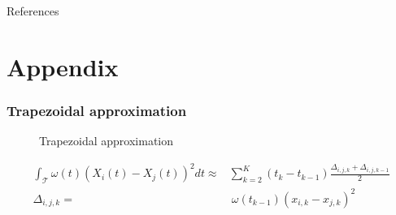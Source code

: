 \documentclass{snedecorbeamer}
\begin{document}
\begin{frame}[allowframebreaks]{References}
  \tiny
  
  
\end{frame}

\section{Appendix}
\begin{frame}
  \frametitle{Trapezoidal approximation}

  \begin{figure}[h!]
    \centering
    \caption[]{Trapezoidal approximation}
  \end{figure}

  {
    \setlength{\abovedisplayskip}{-1cm}
    \begin{align}
      \int_{\mathcal{T}}
      \omega(t)
      {\left(X_i(t) - X_j(t) \right)}^2 dt
      \approx
      &
      \sum_{k = 2}^{K} {
      \left(t_{k} - t_{k - 1}\right)
      \frac{
      \Delta_{i, j, k} +
      \Delta_{i, j, k - 1}
      }{2}
      } \\
      \Delta_{i, j, k} =
      & \
      \omega(t_{k-1}) {\left(x_{i, k} - x_{j, k}\right)}^2
    \end{align}
  }

\end{frame}
\end{document}
